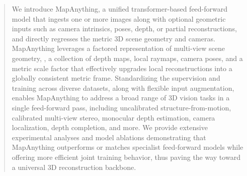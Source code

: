 \begin{abstract}
We introduce MapAnything, a unified transformer-based feed-forward model that ingests one or more images along with optional geometric inputs such as camera intrinsics, poses, depth, or partial reconstructions, and directly regresses the metric 3D scene geometry and cameras.
MapAnything leverages a factored representation of multi-view scene geometry, \ie, a collection of depth maps, local raymaps, camera poses, and a metric scale factor that effectively upgrades local reconstructions into a globally consistent metric frame.
Standardizing the supervision and training across diverse datasets, along with flexible input augmentation, enables MapAnything to address a broad range of 3D vision tasks in a single feed-forward pass, including uncalibrated structure-from-motion, calibrated multi-view stereo, monocular depth estimation, camera localization, depth completion, and more.
We provide extensive experimental analyses and model ablations demonstrating that MapAnything outperforms or matches specialist feed-forward models while offering more efficient joint training behavior, thus paving the way toward a universal 3D reconstruction backbone.



\end{abstract}
